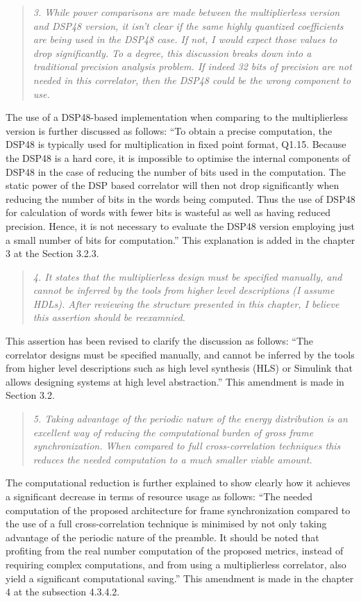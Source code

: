 \documentclass{article}
\begin{document}
\begin{quote}
\emph{3. While power comparisons are made between the multiplierless version and DSP48 version, it isn't clear if the same highly quantized coefficients are being used in the DSP48 case. If not, I would expect those values to drop significantly. To a degree, this discussion breaks down into a traditional precision analysis problem. If indeed 32 bits of precision are not needed in this correlator, then the DSP48 could be the wrong component to use.}
\end{quote}
The use of a DSP48-based implementation when comparing to the multiplierless version is further discussed as follows:
``To obtain a precise computation, the DSP48 is typically used for multiplication in fixed point format, Q1.15. Because the DSP48 is a hard core, it is impossible to optimise the internal components of DSP48 in the case of reducing the number of bits used in the computation. The static power of the DSP based correlator will then not drop significantly when reducing the number of bits in the words being computed. Thus the use of DSP48 for calculation of words with fewer bits is wasteful as well as having reduced precision. Hence, it is not necessary to evaluate the DSP48 version employing just a small number of  bits for computation.''
This explanation is added in the chapter 3 at the Section 3.2.3.

\begin{quote}
\emph{4. It states that the multiplierless design must be specified manually, and cannot be inferred by the tools from higher level descriptions (I assume HDLs). After reviewing the structure presented in this chapter, I believe this assertion should be reexamnied.}
\end{quote}
This assertion has been revised to clarify the discussion as follows:
``The correlator designs must be specified manually, and cannot be inferred by the tools from higher level descriptions such as high level synthesis (HLS) or Simulink that allows designing systems at high level abstraction.''
This amendment is made in Section 3.2.

\begin{quote}
\emph{5. Taking advantage of the periodic nature of the energy distribution is an excellent way of reducing the computational burden of gross frame synchronization. When compared to full cross-correlation techniques this reduces the needed computation to a much smaller viable amount.}
\end{quote}
The computational reduction is further explained to show clearly how it achieves a significant decrease in terms of resource usage as follows:
``The needed computation of the proposed architecture for frame synchronization compared to the use of a full cross-correlation technique is minimised by not only taking advantage of the periodic nature of the preamble.
It should be noted that profiting from the real number computation of the proposed metrics, instead of requiring complex computations, and from using a multiplierless correlator, also yield a significant computational saving.''
This amendment is made in the chapter 4 at the subsection 4.3.4.2.
\end{document}
